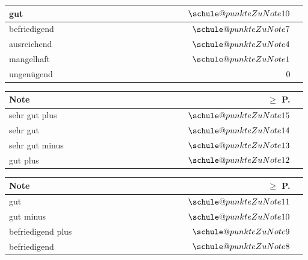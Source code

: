 {{{{\begin{tabular}{|p{0.6\linewidth}|r|r|}
                    \rowcolor{black!10}
                    gut  & $\schule@punkteZuNote{10}$\\\hline
                    befriedigend & $\schule@punkteZuNote{7}$\\\hline
                    \rowcolor{black!10}
                    ausreichend & $\schule@punkteZuNote{4}$\\\hline
                    mangelhaft & $\schule@punkteZuNote{1}$ \\\hline
                    \rowcolor{black!10}
                    ungenügend & $0$ \\\hline
                \end{tabular}
            }
        }{
            \parbox{.24\linewidth}{
                \tiny
                \begin{tabular}{|p{0.6\linewidth}|r|r|}\hline
                    \rowcolor{black!20}\textbf{Note}  &
                    \textbf{$\ge$ P.}
                    \\\hline
                    sehr gut plus  & $\schule@punkteZuNote{15}$\\\hline
                    \rowcolor{black!10}
                    sehr gut  & $\schule@punkteZuNote{14}$\\\hline
                    sehr gut minus  & $\schule@punkteZuNote{13}$\\\hline
                    \rowcolor{black!10}
                    gut plus  & $\schule@punkteZuNote{12}$\\\hline
                \end{tabular}
            }
            \parbox{.24\linewidth}{
                \tiny
                \begin{tabular}{|p{0.6\linewidth}|r|r|}\hline
                    \rowcolor{black!20}\textbf{Note}  &
                    \textbf{$\ge$ P.}
                    \\\hline
                    gut & $\schule@punkteZuNote{11}$\\\hline
                    \rowcolor{black!10}
                    gut minus  & $\schule@punkteZuNote{10}$ \\\hline
                    befriedigend plus & $\schule@punkteZuNote{9}$\\\hline
                    \rowcolor{black!10}
                    befriedigend  & $\schule@punkteZuNote{8}$\\\hline
                \end{tabular}
}}}}
